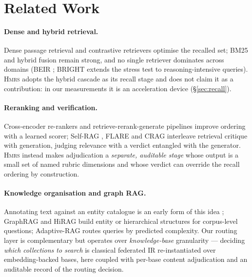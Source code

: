 \documentclass[sigconf, review, anonymous]{acmart}
\newcommand{\sys}{\textsc{Hmrs}}
\begin{document}
\section{Related Work}\label{sec:related}

\paragraph{Dense and hybrid retrieval.}
Dense passage retrieval \cite{karpukhin2020dpr} and contrastive retrievers
\cite{izacard2022contriever} optimise the recalled set; BM25
\cite{robertson2009bm25} and hybrid fusion remain strong, and no single
retriever dominates across domains (BEIR \cite{thakur2021beir}; BRIGHT
\cite{su2025bright} extends the stress test to reasoning-intensive queries).
\sys{} adopts the hybrid cascade as its recall stage
and does not claim it as a contribution: in our measurements it is an
acceleration device (\S\ref{sec:recall}).

\paragraph{Reranking and verification.}
Cross-encoder re-rankers \cite{nogueira2019rerank} and retrieve-rerank-generate
pipelines \cite{glass2022re2g} improve ordering with a learned scorer;
Self-RAG \cite{asai2023selfrag}, FLARE \cite{jiang2023flare} and CRAG
\cite{yan2024crag} interleave retrieval critique with generation, judging
relevance with a verdict entangled with the generator. \sys{} instead makes
adjudication a \emph{separate, auditable stage} whose output is a small set of
named rubric dimensions and whose verdict can override the recall ordering by
construction.

\paragraph{Knowledge organisation and graph RAG.}
Annotating text against an entity catalogue is an early form of this idea
\cite{tagme2010ferragina}; GraphRAG \cite{edge2024graphrag} and HiRAG
\cite{huang2025hirag} build entity or hierarchical structures for corpus-level
questions; Adaptive-RAG \cite{jeong2024adaptiverag} routes queries by predicted
complexity. Our routing layer is complementary but operates over
\emph{knowledge-base} granularity --- deciding \emph{which collections to
search} is classical federated IR
\cite{callan1995distributed,callan2000distributed} re-instantiated over
embedding-backed bases, here coupled with per-base content adjudication and an
auditable record of the routing decision.
\end{document}

